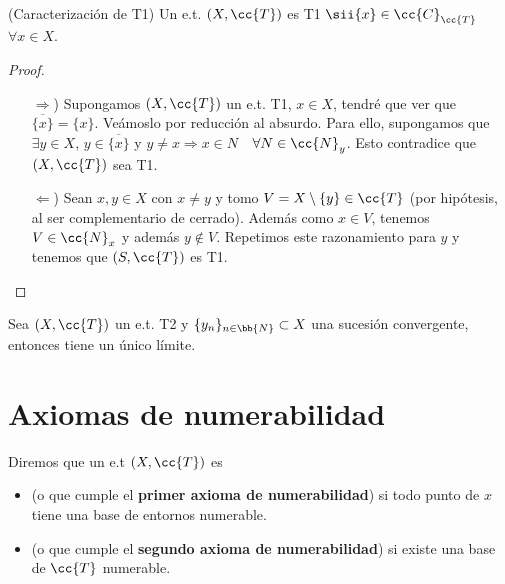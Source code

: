 \begin{prop}(Caracterización de T1)
    Un e.t. $(X, \cc{T})$ es T1 $\sii \{x\}\in \cc{C}_{\cc{T}}$\ \ $\forall x \in X$.

    \begin{proof}\
        \begin{itemize}
            \item[$\Rightarrow$)] Supongamos $(X, \cc{T})$ un e.t. T1, $x \in X$, tendré que ver que $\overline{\{x\}} = \{x\}$. Veámoslo por reducción al absurdo. Para ello, supongamos que $\exists y \in X$, $y\in \overline{\{x\}}$ y $y \neq x \Rightarrow x \in N$\ \ $\forall N \in \cc{N}_y$. Esto contradice que $(X, \cc{T})$ sea T1.
            \item[$\Leftarrow$)] Sean $x,y\in X$ con $x\neq y$ y tomo $V=X\setminus\{y\}\in \cc{T}$ (por hipótesis, al ser complementario de cerrado). Además como $x \in V$, tenemos $V\in \cc{N}_x$ y además $y\notin V$. Repetimos este razonamiento para $y$ y tenemos que $(S, \cc{T})$ es T1. 
        \end{itemize}
    \end{proof}
\end{prop}

\begin{ejercicio}
    Sea $(X, \cc{T})$ un e.t. T2 y $\{y_n\}_{n\in \bb{N}}\subset X$ una sucesión convergente, entonces tiene un único límite.
    \endsquare
\end{ejercicio}

\section{Axiomas de numerabilidad}

\begin{definicion}
    Diremos que un e.t $(X, \cc{T})$ es 
    \begin{itemize}
        \item {} (o que cumple el \textbf{primer axioma de numerabilidad}) si todo punto de $x$ tiene una base de entornos numerable.
        \item \objetivo{2AN} (o que cumple el \textbf{segundo axioma de numerabilidad}) si existe una base de $\cc{T}$ numerable.
    \end{itemize}
    \endsquare
\end{definicion}

